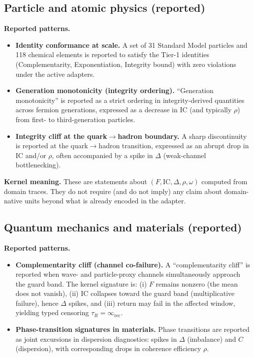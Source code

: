 \documentclass[
  aps,
  prd,
  preprint,
  superscriptaddress,
  nofootinbib,
  floatfix
]{revtex4-2}
\newcommand{\Rinf}{\infty_{\mathrm{rec}}}
\newcommand{\IC}{\mathrm{IC}}
\begin{document}
\subsection{Particle and atomic physics (reported)}
\label{subsec:particle_atomic}

\noindent\textbf{Reported patterns.}
\begin{itemize}[leftmargin=1.6em]
  \item \textbf{Identity conformance at scale.}
  A set of 31 Standard Model particles and 118 chemical elements is reported to satisfy the Tier-1 identities
  (Complementarity, Exponentiation, Integrity bound) with zero violations under the active adapters.
  \item \textbf{Generation monotonicity (integrity ordering).}
  ``Generation monotonicity'' is reported as a strict ordering in integrity-derived quantities across fermion generations,
  expressed as a decrease in $\IC$ (and typically $\rho$) from first- to third-generation particles.
  \item \textbf{Integrity cliff at the quark$\to$hadron boundary.}
  A sharp discontinuity is reported at the quark$\to$hadron transition, expressed as an abrupt drop in $\IC$ and/or $\rho$,
  often accompanied by a spike in $\Delta$ (weak-channel bottlenecking).
\end{itemize}

\noindent\textbf{Kernel meaning.}
These are statements about $(F,\IC,\Delta,\rho,\omega)$ computed from domain traces.
They do not require (and do not imply) any claim about domain-native units beyond what is already encoded in the adapter.

\subsection{Quantum mechanics and materials (reported)}
\label{subsec:quantum_materials}

\noindent\textbf{Reported patterns.}
\begin{itemize}[leftmargin=1.6em]
  \item \textbf{Complementarity cliff (channel co-failure).}
  A ``complementarity cliff'' is reported when wave- and particle-proxy channels simultaneously approach the guard band.
  The kernel signature is:
  (i) $F$ remains nonzero (the mean does not vanish),
  (ii) $\IC$ collapses toward the guard band (multiplicative failure), hence $\Delta$ spikes,
  and (iii) return may fail in the affected window, yielding typed censoring $\tau_R=\Rinf$.
  \item \textbf{Phase-transition signatures in materials.}
  Phase transitions are reported as joint excursions in dispersion diagnostics:
  spikes in $\Delta$ (imbalance) and $C$ (dispersion), with corresponding drops in coherence efficiency $\rho$.
\end{itemize}
\end{document}
